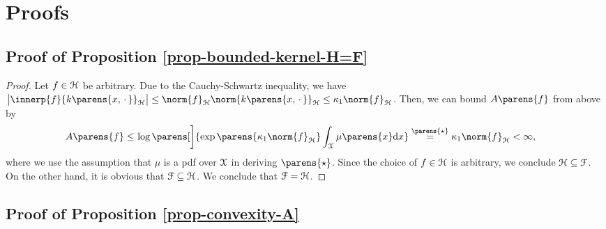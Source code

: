 \newpage 

\section{Proofs}\label{section-chapter2-proof}


\subsection{Proof of Proposition \ref{prop-bounded-kernel-H=F}}\label{subsection-proof-prop-bounded-kernel-H=F}

\begin{proof}
	Let $f \in \mathcal{H}$ be arbitrary. Due to the Cauchy-Schwartz inequality, we have $\abs[\big]{\innerp{f}{k \parens{x, \,\cdot\,}}_{\calH}} \le \norm{f}_{\calH} \norm{k \parens{x, \,\cdot\,}}_{\calH} \le \kappa_1 \norm{f}_{\calH}$. Then, we can bound $A \parens{f}$ from above by 
	\begin{align*}
		A \parens{f} \le & \, \log \parens[\bigg]{\exp \parens{\kappa_1 \norm{f}_{\calH} } \int_{\calX} \mu \parens{x}  \diff x} \stackrel{\parens{\star}}{=} \kappa_1 \norm{f}_{\calH} < \infty, 
	\end{align*}
	where we use the assumption that $\mu$ is a pdf over $\mathcal{X}$ in deriving $\parens{\star}$. Since the choice of $f \in \mathcal{H}$ is arbitrary, we conclude $\mathcal{H} \subseteq \mathcal{F}$. On the other hand, it is obvious that $\mathcal{F} \subseteq \mathcal{H}$. We conclude that $\mathcal{F} = \mathcal{H}$. 
\end{proof}


\subsection{Proof of Proposition \ref{prop-convexity-A}}\label{subsection-prop-convexity-A}

